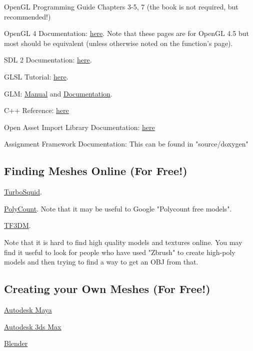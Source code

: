 \documentclass{article}
\begin{document}
\begin{enumerate*}
    \item OpenGL Programming Guide Chapters 3-5, 7 (the book is not required, but recommended!)
    \item OpenGL 4 Documentation: \href{https://www.opengl.org/sdk/docs/man4/}{here}. Note that these pages are for OpenGL 4.5 but most should be equivalent (unless otherwise noted on the function's page).
    \item SDL 2 Documentation: \href{https://wiki.libsdl.org/CategoryAPI}{here}.
    \item GLSL Tutorial: \href{http://www.lighthouse3d.com/tutorials/glsl-tutorial/}{here}.
    \item GLM: \href{http://glm.g-truc.net/0.9.7/glm-0.9.7.pdf}{Manual} and \href{http://glm.g-truc.net/0.9.7/api/index.html}{Documentation}.
    \item C++ Reference: \href{http://en.cppreference.com/w/}{here}
    \item Open Asset Import Library Documentation: \href{http://assimp.sourceforge.net/lib_html/index.html}{here}
    \item Assignment Framework Documentation: This can be found in "source/doxygen"
\end{enumerate*}

\subsection*{Finding Meshes Online (For Free!)}
\begin{enumerate*}
    \item \href{http://www.turbosquid.com/}{TurboSquid}.
    \item \href{http://www.polycount.com/forum/}{PolyCount}. Note that it may be useful to Google "Polycount free models".
    \item \href{http://tf3dm.com/}{TF3DM}.
\end{enumerate*}

Note that it is hard to find high quality models and textures online. You may find it useful to look for people who have used "Zbrush" to create high-poly models and then trying to find a way to get an OBJ from that.

\subsection*{Creating your Own Meshes (For Free!)}
\begin{enumerate*}
    \item \href{http://www.autodesk.com/education/free-software/maya}{Autodesk Maya}
    \item \href{http://www.autodesk.com/education/free-software/3ds-max}{Autodesk 3ds Max}
    \item \href{https://www.blender.org/}{Blender}
\end{enumerate*}
\end{document}
